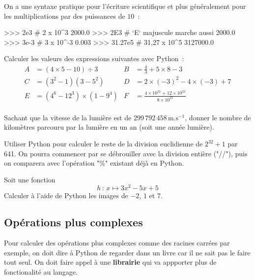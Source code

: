 On a une syntaxe pratique pour l'écriture scientifique et plus généralement pour les multiplications
par des puissances de $10$~:

\begin{pythoncode}
>>> 2e3      # 2 x 10^3
2000.0
>>> 2E3      # `E` majuscule marche aussi
2000.0
>>> 3e-3     # 3 x 10^-3
0.003
>>> 31.27e5  # 31,27 x 10^5
3127000.0
\end{pythoncode}

\begin{exercice}
Calculer les valeurs des expressions suivantes avec Python~:
\begin{align*}
A &= (4\times5 - 10)\div 3
&
B &= \frac{4}{3}+5\times8-3\\
C &= (3^2-1)(3-5^2)
&
D &= 2\times(-3)^2-4\times(-3)+7\\
E &= \left(4^6-12^3\right)\times(1-9^4)
&
F &= \frac{4\times10^{21}+12\times10^{23}}{8\times10^{25}}\\
\end{align*}
\end{exercice}

\begin{exercice}
Sachant que la vitesse de la lumière est de $299\,792\,458\,\text{m}.\text{s}^{-1}$,
donner le nombre de kilomètres parcouru par la lumière en un an (soit une année lumière).
\end{exercice}

\begin{exercice}
Utiliser Python pour calculer le reste de la division euclidienne de $2^{32}+1$ par 641. On pourra commencer par se débrouiller avec la division entière ("//"), puis on comparera avec l'opération "\%" existant déjà en Python.
\end{exercice}

\begin{exercice}\label{python:debuts:exofct}
Soit une fonction \[h\,:\,x\longmapsto 3x^2-5x+5\]
 Calculer à l'aide de Python les images	de $-2$, $1$ et $7$.
\end{exercice}

\subsection{Opérations plus complexes}
Pour calculer des opérations plus complexes comme des racines carrées par exemple, on doit dire à
Python de regarder dans un livre car il ne sait pas le faire tout seul. On doit faire appel à une
\textbf{librairie} qui va appporter plus de fonctionalité au langage.

